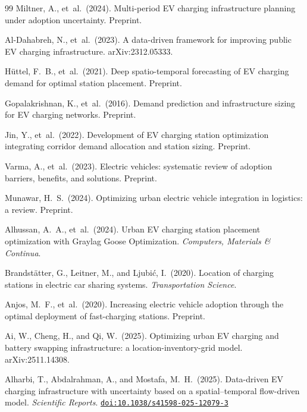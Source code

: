 \documentclass[12pt,letterpaper]{article}
\newcommand{\doi}[1]{\href{https://doi.org/#1}{\texttt{doi:#1}}}
\begin{document}
\begin{thebibliography}{99}
Miltner, A., et~al.\ (2024).
Multi-period EV charging infrastructure planning under adoption uncertainty.
Preprint.

Al-Dahabreh, N., et~al.\ (2023).
A data-driven framework for improving public EV charging infrastructure.
arXiv:2312.05333.

H{\"u}ttel, F.\ B., et~al.\ (2021).
Deep spatio-temporal forecasting of EV charging demand for optimal
  station placement.
Preprint.

Gopalakrishnan, K., et~al.\ (2016).
Demand prediction and infrastructure sizing for EV charging networks.
Preprint.

Jin, Y., et~al.\ (2022).
Development of EV charging station optimization integrating corridor
  demand allocation and station sizing.
Preprint.

Varma, A., et~al.\ (2023).
Electric vehicles: systematic review of adoption barriers, benefits,
  and solutions.
Preprint.

Munawar, H.\ S.\ (2024).
Optimizing urban electric vehicle integration in logistics: a review.
Preprint.

Alhussan, A.\ A., et~al.\ (2024).
Urban EV charging station placement optimization with Graylag Goose
  Optimization.
\textit{Computers, Materials \& Continua}.

Brandst{\"a}tter, G., Leitner, M., and Ljubi{\'c}, I.\ (2020).
Location of charging stations in electric car sharing systems.
\textit{Transportation Science}.

Anjos, M.\ F., et~al.\ (2020).
Increasing electric vehicle adoption through the optimal deployment of
  fast-charging stations.
Preprint.

Ai, W., Cheng, H., and Qi, W.\ (2025).
Optimizing urban EV charging and battery swapping infrastructure:
  a location-inventory-grid model.
arXiv:2511.14308.

Alharbi, T., Abdalrahman, A., and Mostafa, M.\ H.\ (2025).
Data-driven EV charging infrastructure with uncertainty based on a
  spatial--temporal flow-driven model.
\textit{Scientific Reports}.
\doi{10.1038/s41598-025-12079-3}


\end{thebibliography}
\end{document}
